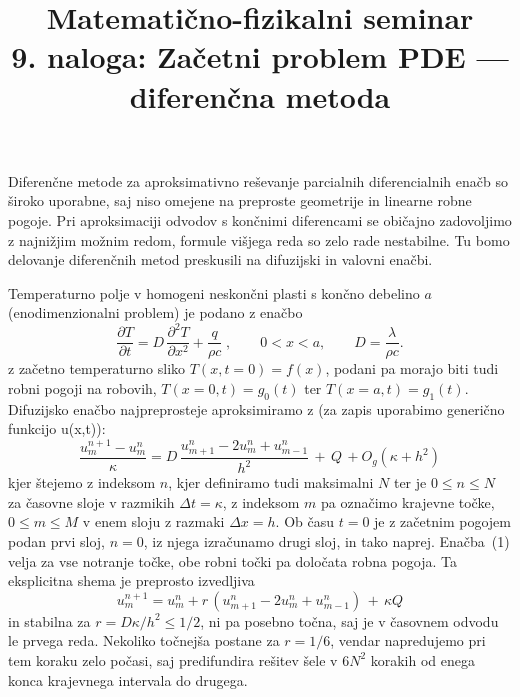 \documentclass[slovene,11pt,a4paper]{article}
\title{
\sc\large Matematično-fizikalni seminar \thisyear\\
\bigskip
\bf 9. naloga: Začetni problem PDE --- diferenčna metoda}
\author{}
\date{}
\begin{document}
\maketitle
\vspace{-1cm}

Diferenčne metode za aproksimativno reševanje parcialnih
diferencialnih enačb so široko uporabne, saj niso omejene na
preproste geometrije in linearne robne pogoje. Pri aproksimaciji
odvodov s končnimi diferencami se običajno zadovoljimo z najnižjim
možnim redom, formule višjega reda so zelo rade nestabilne.
Tu bomo delovanje diferenčnih metod preskusili na difuzijski in
valovni enačbi.

Temperaturno polje v homogeni neskončni plasti s končno
debelino $a$ (enodimenzio\-nalni problem) je podano z enačbo
\[
\frac{\partial T}{\partial t} = D\,\frac{\partial^2 T}{\partial x^2}
+ \frac{q}{\rho c}\;,\qquad 0<x<a,\qquad D=\frac{\lambda}{\rho c}.
\]
z začetno temperaturno sliko $T(x,t=0)=f(x)$, podani pa morajo biti tudi robni pogoji 
na robovih, $T(x=0,t)=g_0(t)$ ter  $T(x=a,t)=g_1(t)$. Difuzijsko enačbo
najpreprosteje aproksimiramo z (za zapis uporabimo generično funkcijo u(x,t)):
\begin{equation}
\frac{u_{m}^{n+1}-u_{m}^{n}}{\kappa}=D\, \frac{u_{m+1}^{n}-2 u_{m}^{n}+u_{m-1}^{n}}{h^{2}}\, +\, Q \, +O_g\left(\kappa+h^{2}\right)
\end{equation}
kjer štejemo z indeksom $n$, kjer definiramo tudi maksimalni $N$ ter je $0 \leq n \leq N$ za časovne sloje v razmikih $\Delta t = \kappa$,
z indeksom $m$ pa označimo krajevne točke, $0 \leq m \leq M$ v enem
sloju z razmaki $\Delta x = h$. Ob času $t=0$ je z začetnim pogojem podan prvi sloj, $n=0$,
iz njega izračunamo drugi sloj, in tako naprej. Enačba~(1) velja
za vse notranje točke, obe robni točki pa določata robna pogoja.
Ta eksplicitna shema je preprosto izvedljiva 
\[
u_{m}^{n+1}=u_{m}^{n}+r\, \left(u_{m+1}^{n}-2 u_{m}^{n}+u_{m-1}^{n}\right)\, +\, \kappa Q 
\]
in stabilna  za $r=D\kappa/h^2 \leq 1/2$, ni pa posebno točna, saj je v časovnem odvodu le
prvega reda. Nekoliko točnejša postane za $r=1/6$, vendar napredujemo
pri tem koraku zelo počasi, saj predifundira rešitev šele v
$6N^2$ korakih od enega konca krajevnega intervala do drugega.
\end{document}
